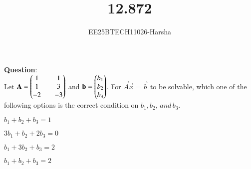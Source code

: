 \documentclass[journal]{IEEEtran}
\begin{document}

\vspace{3cm}

\title{12.872}
\author{EE25BTECH11026-Harsha}
 \maketitle
{\let\newpage\relax\maketitle}

\renewcommand{\thefigure}{\theenumi}
\renewcommand{\thetable}{\theenumi}
\setlength{\intextsep}{10pt} %


\renewcommand{\thetable}{\theenumi}

\textbf{Question}:\\
Let $\mathbf{A}=\begin{pmatrix}1&&1\\1&&3\\-2&&-3\end{pmatrix}$ and $\mathbf{b}=\begin{pmatrix}b_1\\b_2\\b_3\end{pmatrix}$. For $\vec{A}\vec{x}=\vec{b}$ to be solvable, which one of the following options is the correct condition on $b_1,b_2,\,and\,b_3$.
\begin{enumerate}
\begin{multicols}{2}
    \item $b_1+b_2+b_3=1$
    \item $3b_1+b_2+2b_3=0$
    \item $b_1+3b_2+b_3=2$
    \item $b_1+b_2+b_3=2$
\end{multicols}
\end{enumerate}
\end{document}
